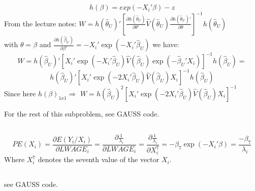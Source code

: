 \documentclass[11pt]{article}
\theoremstyle{break}
\begin{document}
\subsection{}
$$h(\beta) = exp(-X_i'\beta) - z$$
From the lecture notes: $W=h(\hat{\theta}_U)'[\frac{\partial h(\hat{\theta}_U)}{\partial \theta'}\hat{V}(\hat{\theta}_U)\frac{\partial h(\hat{\theta}_U)'}{\partial \theta}]^{-1}h(\hat{\theta}_U)$ \\
with $\theta=\beta$ and $\frac{\partial h(\hat{\beta}_U)}{\partial \beta'} = -X_i'\exp(-X_i'\hat{\beta}_U)$ we have: \\
$$W=h(\hat{\beta}_U)'[X_i'\exp(-X_i'\hat{\beta}_U)\hat{V}(\hat{\beta}_U)\exp(-\hat{\beta}_U'X_i)]^{-1}h(\hat{\beta}_U) = $$ 
$$ h(\hat{\beta}_U)'[X_i'\exp(-2X_i'\hat{\beta}_U)\hat{V}(\hat{\beta}_U)X_i]^{-1}h(\hat{\beta}_U)$$ Since here $h(\beta)_{1x1} \Rightarrow$ $W=h(\hat{\beta}_U)^2[X_i'\exp(-2X_i'\hat{\beta}_U)\hat{V}(\hat{\beta}_U)X_i]^{-1}$

For the rest of this subproblem, see GAUSS code.

\subsection{}
$$PE(X_i) = \frac{\partial E(Y_i/X_i)}{\partial LWAGE_i} = \frac{\partial{\frac{1}{\lambda_i}}}{\partial LWAGE_i} = \frac{\partial{\frac{1}{\lambda_i}}}{\partial X_i^7} = -\beta_7\exp(-X_i'\beta) = \frac{-\beta_7}{\lambda_i}$$ Where $X_i^7$ denotes the seventh value of the vector $X_i$.

\subsection{}
see GAUSS code.
\end{document}
